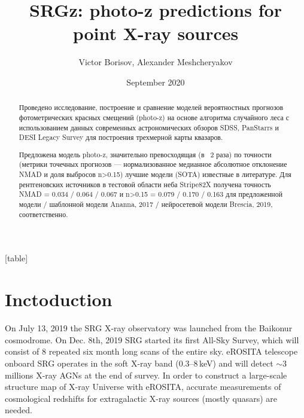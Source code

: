 \documentclass[fleqn,usenatbib]{mnras}
\title[SRGz: photo-z predictions]{SRGz: photo-z predictions for point X-ray sources}
\author[Borisov et al.]{Victor Borisov, Alexander Meshcheryakov %
}
\date{September 2020}
\begin{document}
[table]
\renewcommand{\therowcntr}{\arabic{rowcntr}}
\newcolumntype{N}{>{\refstepcounter{rowcntr}\therowcntr}c}

\newcommand{\expnumber}[2]{{#1}\mathrm{e}{#2}}

\maketitle
\begin{abstract}
Проведено исследование, построение и сравнение моделей вероятностных прогнозов фотометрических красных смещений (photo-z) на основе алгоритма случайного леса  с использованием данных современных астрономических обзоров SDSS, PanStarrs и DESI Legacy Survey для построения трехмерной карты квазаров.

Предложена модель photo-z, значительно превосходящая (в ~2 раза) по точности (метрики точечных прогнозов — нормализованное медианное абсолютное отклонение NMAD и доля выбросов n>0.15) лучшие модели (SOTA) известные в литературе. Для рентгеновских источников в тестовой области неба Stripe82X получена точность NMAD = 0.034 / 0.064 / 0.067 и n>0.15 = 0.079 / 0.170 / 0.163 для предложенной модели / шаблонной модели Ananna, 2017 / нейросетевой модели Brescia, 2019, соответственно.
\end{abstract}



\section{Inctoduction}

On July 13, 2019 the SRG X-ray observatory
was launched from the Baikonur cosmodrome. On Dec. 8th, 2019 SRG started its first All-Sky Survey, which will consist of 8 repeated six month long scans of the entire sky. eROSITA telescope \citep{2020arXiv201003477P} onboard SRG operates in the soft X-ray band (0.3–8\,keV) and will detect $\sim3$ millions X-ray AGNs at the end of survey. In order to construct a large-scale structure map of X-ray Universe with eROSITA, accurate measurements of cosmological redshifts for extragalactic X-ray sources (mostly quasars) are needed.
\end{document}
